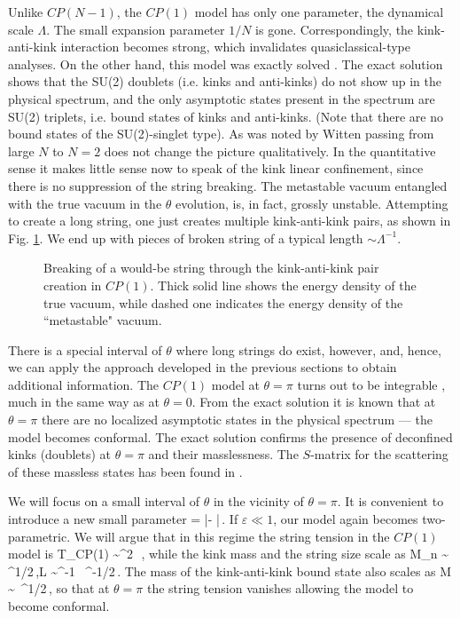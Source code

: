 Unlike $CP(N-1)$, the
$CP(1)$ model has only one parameter, the dynamical scale
$\Lambda$. The small expansion parameter $1/N$ is gone.
Correspondingly, the kink-anti-kink  interaction becomes strong,
which invalidates quasiclassical-type  analyses. On the other hand,
this model was exactly solved \cite{SBone}.
The exact solution shows that the SU(2) doublets
(i.e. kinks and anti-kinks) do not show up in the physical spectrum,
and the only asymptotic states present in the  spectrum are
SU(2) triplets, i.e.  bound states of kinks and anti-kinks.
(Note that there are no bound states of the SU(2)-singlet type).
As was noted by Witten \cite{5} passing from large $N$
to $N=2$ does not change the picture qualitatively.
In the quantitative sense it makes little sense now to speak
of the kink linear confinement, since there is no suppression
of the string breaking. The metastable vacuum 
entangled with the true vacuum in the $\theta$ evolution,
is, in fact, grossly unstable. Attempting to create a long string,
one just creates multiple kink-anti-kink pairs, as shown in Fig.
\ref{figSBone}. We end up with pieces of broken string
of a typical length $\sim \Lambda^{-1}$.

\begin{figure}
\epsfxsize=11cm
\centerline{}
\caption{
Breaking of a would-be string through the kink-anti-kink pair creation in
$CP(1)$.  Thick solid line shows the energy density of the true vacuum,
while dashed one indicates the energy density of the ``metastable"
vacuum.}
\label{figSBone}
\end{figure}

There is a special interval of $\theta$ where long strings
do exist, however, and, hence, we can apply the approach developed in
the previous sections to obtain additional information.
The $CP(1)$ model at $\theta=\pi$   turns out to be integrable 
\cite{Zam,Fat},
much in the same way as at $\theta =0$. From the exact 
solution \cite{Zam,Fat} it is known that
at $\theta =\pi$ there 
are no localized asymptotic states in the physical spectrum ---
the model becomes conformal.
The exact solution confirms the presence of deconfined kinks
(doublets) at $\theta=\pi$
and their masslessness. The $S$-matrix for the scattering
of these massless states has been found in \cite{Zam,Fat}.

We will focus on a small interval
of $\theta$ in the vicinity of $\theta =\pi$. It is convenient to
introduce a new small parameter
\beq
\varepsilon = |\pi - \theta |\,.
\label{ma}
\eeq 
If $\varepsilon \ll 1$, our model again becomes
two-parametric. We will argue that in this regime
the string tension in  the $CP(1)$ model is
\beq
\Delta T_{CP(1)} \sim \Lambda^2\,  \varepsilon\,,
\label{maa}
\eeq
while the kink mass and the string size scale as
\beq
M_n \sim \Lambda \,  \varepsilon^{1/2}\,,\qquad L \sim \Lambda^{-1}
\,  \varepsilon^{-1/2}\,.
\label{maaa}
\eeq
The mass of the kink-anti-kink bound state
also scales as
\beq
M \sim \Lambda \,  \varepsilon^{1/2}\,,
\label{maaam}
\eeq
so that at $\theta =\pi$ the string tension vanishes
allowing the model to become conformal.

